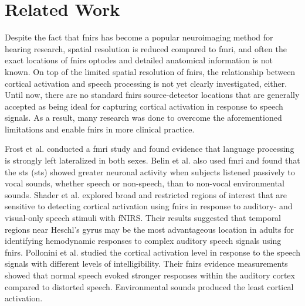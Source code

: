 \section{Related Work}


Despite the fact that \acrshort{fnirs} has become a popular neuroimaging method for hearing research, spatial resolution is reduced compared to \acrshort{fmri}, and often the exact locations of \acrshort{fnirs} optodes and detailed anatomical information is not known. On top of the limited spatial resolution of \acrshort{fnirs}, the relationship between cortical activation and speech processing is not yet clearly investigated, either. Until now,  there are no standard \acrshort{fnirs} source-detector locations that are generally accepted as being ideal for capturing cortical activation in response to speech signals. As a result, many research was done to overcome the aforementioned limitations and enable \acrshort{fnirs} in more clinical practice.

Frost et al. \citeyearpar {Frost1999-vs} conducted a \acrshort{fmri} study and found evidence that language processing is strongly left lateralized in both sexes. Belin et al. \citeyearpar {Belin2000} also used \acrshort{fmri} and found that the \acrlong{sts} (\acrshort{sts}) showed greater neuronal activity when subjects listened passively to vocal sounds, whether speech or non-speech, than to non-vocal environmental sounds. Shader et al. \citeyearpar {Shader2021} explored broad and restricted regions of interest that are sensitive to detecting cortical activation using  \acrshort{fnirs} in response to auditory- and visual-only speech stimuli with fNIRS. Their results suggested that temporal regions near Heschl's gyrus may be the most advantageous location in adults for identifying hemodynamic responses to complex auditory speech signals using \acrshort{fnirs}. Pollonini et al. \citeyearpar{Pollonini2013} studied the cortical activation level in response to the speech signals with different levels of intelligibility. Their \acrshort{fnirs} evidence measurements showed that normal speech evoked stronger responses within the auditory cortex compared to distorted speech. Environmental sounds produced the least cortical activation.


